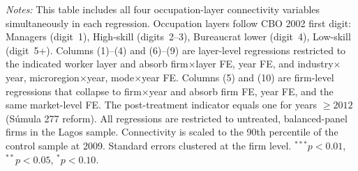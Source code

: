 \begin{table}[H]
{\begin{tabular}{lcccccccccc}
\bottomrule
\end{tabular}}
\begin{minipage}{\linewidth}
\scriptsize\vspace{4pt}
\textit{Notes:} This table includes all four occupation-layer connectivity variables simultaneously in each regression. Occupation layers follow CBO 2002 first digit: Managers (digit~1), High-skill (digits~2--3), Bureaucrat lower (digit~4), Low-skill (digit~5+). Columns (1)--(4) and (6)--(9) are layer-level regressions restricted to the indicated worker layer and absorb firm$\times$layer FE, year FE, and industry$\times$year, microregion$\times$year, mode$\times$year FE. Columns (5) and (10) are firm-level regressions that collapse to firm$\times$year and absorb firm FE, year FE, and the same market-level FE. The post-treatment indicator equals one for years $\geq 2012$ (S\'{u}mula 277 reform). All regressions are restricted to untreated, balanced-panel firms in the Lagos sample. Connectivity is scaled to the 90th percentile of the control sample at 2009. Standard errors clustered at the firm level. $^{***}p<0.01$, $^{**}p<0.05$, $^{*}p<0.10$.
\end{minipage}
\end{table}